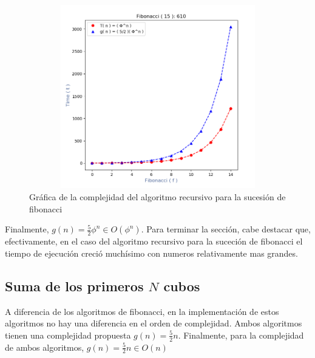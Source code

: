 \documentclass[12pt,twoside]{article}
\begin{document}
\begin{figure}[ht]
    \centering
    \includegraphics[width = 13cm,height = 8cm ]{fibonacci_recursivo_grafica.png}
    \caption{Gr\'afica de la complejidad del algoritmo recursivo para la sucesi\'on de fibonacci}
    \label{fig:fibonacci_recursiva_grafica}
\end{figure}

Finalmente, $g(n) = \frac{5}{2} \phi^n \in O(\phi^n)$. Para terminar la secci\'on, cabe destacar que, efectivamente, en el caso del algoritmo recursivo para la suceci\'on de fibonacci el tiempo de ejecuci\'on creci\'o much\'isimo con numeros relativamente mas grandes.

\subsection{Suma de los primeros $N$ cubos}
A diferencia de los algoritmos de fibonacci, en la implementaci\'on de estos algoritmos no hay una diferencia en el orden de complejidad. Ambos algoritmos tienen una complejidad propuesta $g(n) = \frac{5}{2} n$. Finalmente, para la complejidad de ambos algoritmos, $g(n) = \frac{5}{2} n \in O(n)$
\end{document}
